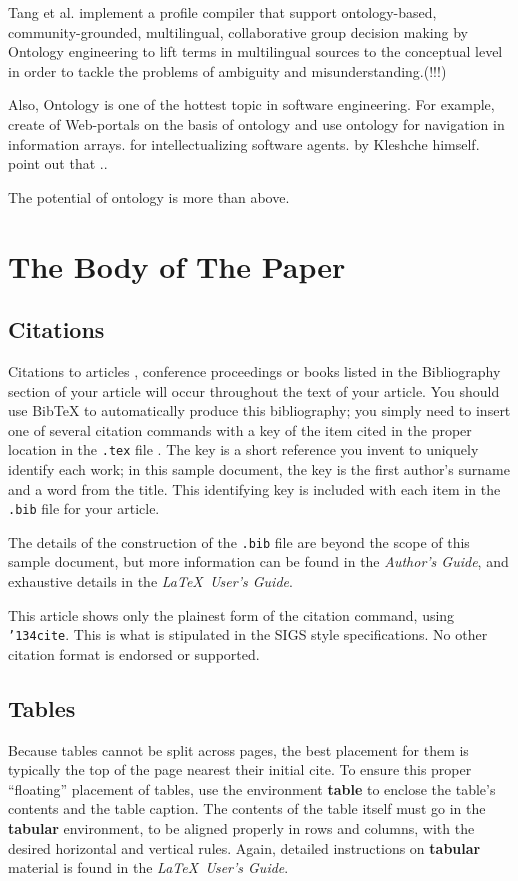 \documentclass{sig-alternate}
\begin{document}
{Tang et al. \cite{ontology5} implement a profile compiler that support ontology-based, community-grounded, multilingual, collaborative group decision making by Ontology engineering to lift terms in multilingual sources to the conceptual level in order to tackle the problems of ambiguity and misunderstanding.(!!!)

Also, Ontology is one of the hottest topic in software engineering. For example, create of Web-portals on the basis of ontology and use ontology for navigation in information arrays. for intellectualizing software agents. \cite{ontology6} by Kleshche himself. point out that ..

The potential of ontology is more than above.
\section{The {\secit Body} of The Paper}

\subsection{Citations}
Citations to articles \cite{bowman:reasoning,
clark:pct, braams:babel, herlihy:methodology},
conference proceedings \cite{clark:pct} or
books \cite{salas:calculus, Lamport:LaTeX} listed
in the Bibliography section of your
article will occur throughout the text of your article.
You should use BibTeX to automatically produce this bibliography;
you simply need to insert one of several citation commands with
a key of the item cited in the proper location in
the \texttt{.tex} file \cite{Lamport:LaTeX}.
The key is a short reference you invent to uniquely
identify each work; in this sample document, the key is
the first author's surname and a
word from the title.  This identifying key is included
with each item in the \texttt{.bib} file for your article.

The details of the construction of the \texttt{.bib} file
are beyond the scope of this sample document, but more
information can be found in the \textit{Author's Guide},
and exhaustive details in the \textit{\LaTeX\ User's
Guide}\cite{Lamport:LaTeX}.

This article shows only the plainest form
of the citation command, using \texttt{{\char'134}cite}.
This is what is stipulated in the SIGS style specifications.
No other citation format is endorsed or supported.

\subsection{Tables}
Because tables cannot be split across pages, the best
placement for them is typically the top of the page
nearest their initial cite.  To
ensure this proper ``floating'' placement of tables, use the
environment \textbf{table} to enclose the table's contents and
the table caption.  The contents of the table itself must go
in the \textbf{tabular} environment, to
be aligned properly in rows and columns, with the desired
horizontal and vertical rules.  Again, detailed instructions
on \textbf{tabular} material
is found in the \textit{\LaTeX\ User's Guide}.

}
\end{document}

